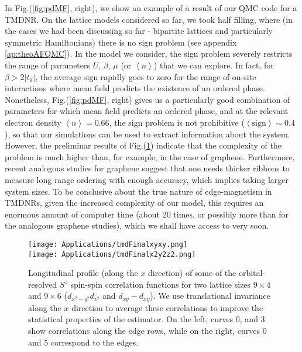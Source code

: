 In Fig.(\ref{fig:pdMF}, right), we show an example of a result of our \ac{QMC} code for a \acs{TMDNR}.
On the lattice models considered so far, we took half filling, where (in the cases we had been discussing so far - bipartite lattices and particularly symmetric Hamiltonians) there is no sign problem (see appendix \ref{ap:theoAFQMC}).
In the model we consider, the sign problem severely restricts the range of parameters $U$, $\beta$, $\mu$ (or $\left\langle n \right\rangle$) that we can explore.
In fact, for $\beta > 2 | t_0 |$, the average sign rapidly goes to zero for the range of on-site interactions where mean field predicts the existence of an ordered phase.
Nonetheless, Fig.(\ref{fig:pdMF}, right) gives us a particularly good combination of parameters for which mean field predicts an ordered phase, and at the relevant electron density $\left\langle n \right\rangle = 0.66$, the sign problem is not prohibitive ($\left\langle \text{sign} \right\rangle \sim0.4$), so that our simulations can be used to extract information about the system.
However, the preliminar results of Fig.(\ref{fig:tmd-data}) indicate that the complexity of the problem is much higher than, for example, in the case of graphene.
Furthermore, recent analogous studies for graphene \cite{feldner_dynamical_2011, yang_strain-tuning_2017,raczkowski_interplay_2017} suggest that one needs thicker ribbons to measure long range ordering with enough accuracy, which implies taking larger system sizes.
To be conclusive about the true nature of edge-magnetism in \ac{TMDNR}s, given the increased complexity of our model, this requires an enormous amount of computer time (about 20 times, or possibly more than for the analogous graphene studies), which we shall have access to very soon.
\vspace{-0.25cm}
\begin{figure}[H]
\centering
\texttt{[image: Applications/tmdFinalxyxy.png]} \\
\hspace{-0.5cm}\texttt{[image: Applications/tmdFinalx2y2z2.png]}
	\caption[Longitudinal profile (along the $x$ direction) of orbital-resolved $S^z$ spin-spin correlation functions we measured, for two lattice sizes: $9 \times 4$ and $9 \times 6$.]{Longitudinal profile (along the $x$ direction) of some of the orbital-resolved $S^z$ spin-spin correlation functions for two lattice sizes $9 \times 4$ and $9 \times 6$ ($d_{x^2-y^2} d_{z^2}$ and $d_{xy} - d_{xy}$).
	We use translational invariance along the $x$ direction to average these correlations to improve the statistical properties of the estimator.
	On the left, curves 0, and 3 show correlations along the edge rows, while on the right, curves 0 and 5 correspond to the edges.}
	\label{fig:tmd-data}
\end{figure}

